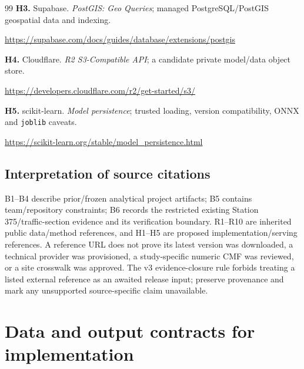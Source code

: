 \documentclass[11pt,a4paper,openany]{report}
\begin{document}
\begin{thebibliography}{99}
\textbf{H3.} Supabase. \emph{PostGIS: Geo Queries}; managed PostgreSQL/PostGIS geospatial data and indexing.\par\url{https://supabase.com/docs/guides/database/extensions/postgis}

\textbf{H4.} Cloudflare. \emph{R2 S3-Compatible API}; a candidate private model/data object store.\par\url{https://developers.cloudflare.com/r2/get-started/s3/}

\textbf{H5.} scikit-learn. \emph{Model persistence}; trusted loading, version compatibility, ONNX and \texttt{joblib} caveats.\par\url{https://scikit-learn.org/stable/model_persistence.html}
\end{thebibliography}

\section{Interpretation of source citations}
B1--B4 describe prior/frozen analytical project artifacts; B5 contains team/repository constraints; B6 records the restricted existing Station 375/traffic-section evidence and its verification boundary. R1--R10 are inherited public data/method references, and H1--H5 are proposed implementation/serving references. A reference URL does not prove its latest version was downloaded, a technical provider was provisioned, a study-specific numeric CMF was reviewed, or a site crosswalk was approved. The v3 evidence-closure rule forbids treating a listed external reference as an awaited release input; preserve provenance and mark any unsupported source-specific claim unavailable.

\chapter{Data and output contracts for implementation}
\end{document}
